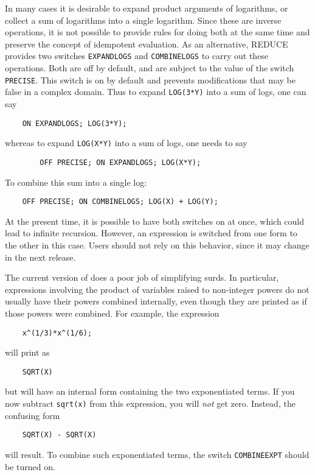 
\hypertarget{switch:COMBINELOGS}{}
\hypertarget{switch:EXPANDLOGS}{}
\hypertarget{switch:PRECISE}{}
In many cases it is desirable to expand product arguments of logarithms,
or collect a sum of logarithms into a single logarithm.  Since these are
inverse operations, it is not possible to provide rules for doing both at
the same time and preserve the {\REDUCE} concept of idempotent evaluation.
As an alternative, REDUCE provides two switches {\tt EXPANDLOGS}
 and {\tt COMBINELOGS} to carry
out these operations.  Both are off by default, and are subject 
to the value of the switch \texttt{PRECISE}. This switch is on
by default and prevents modifications that may be false in a complex domain.
Thus to expand {\tt LOG(3*Y)} into a sum of logs, one can say
\begin{verbatim}
	ON EXPANDLOGS; LOG(3*Y);
\end{verbatim}
whereas to expand {\tt LOG(X*Y)} into a sum of logs, one needs to say
\begin{verbatim}
        OFF PRECISE; ON EXPANDLOGS; LOG(X*Y);
\end{verbatim}
To combine this sum into a single log:
\begin{verbatim}
	OFF PRECISE; ON COMBINELOGS; LOG(X) + LOG(Y);
\end{verbatim}

At the present time, it is possible to have both switches on at once,
which could lead to infinite recursion.  However, an expression is
switched from one form to the other in this case.  Users should not rely
on this behavior, since it may change in the next release.

\hypertarget{switch:COMBINEEXPT}{}
The current version of {\REDUCE} does a poor job of simplifying surds.  In
particular, expressions involving the product of variables raised to
non-integer powers do not usually have their powers combined internally,
even though they are printed as if those powers were combined.  For
example, the expression
\begin{verbatim}
	x^(1/3)*x^(1/6);
\end{verbatim}
will print as
\begin{verbatim}
	SQRT(X)
\end{verbatim}
but will have an internal form containing the two exponentiated terms.
If you now subtract {\tt sqrt(x)} from this expression, you will {\em not\/}
get zero.  Instead, the confusing form
\begin{verbatim}
	SQRT(X) - SQRT(X)
\end{verbatim}
will result.  To combine such exponentiated terms, the switch
{\tt COMBINEEXPT} should be turned on.

